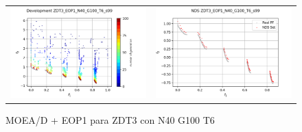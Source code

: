 \begin{figure}[H]
\begin{tabular}{c c}
    \includegraphics[scale=0.5]{figures/ZDT3_EOP1_N40_G100_T6/s99_dev.png} &
    \includegraphics[scale=0.5]{figures/ZDT3_EOP1_N40_G100_T6/s99_nds.png}\\
    \end{tabular}
    \caption{MOEA/D + EOP1 para ZDT3 con N40 G100 T6 }
    \label{fig:12}
\end{figure}

